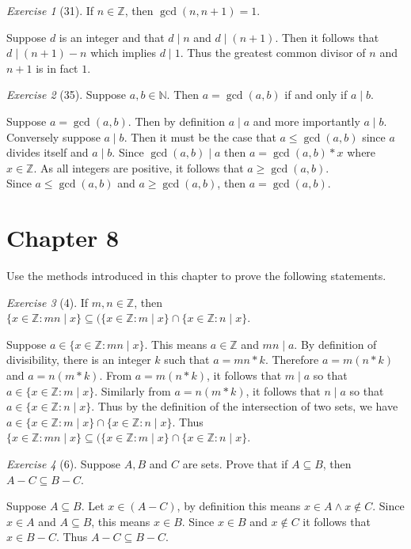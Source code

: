\documentclass[12pt]{amsart}
\makeatletter
\theoremstyle{remark}
\newtheorem*{exercise}{Exercise}%
\def\NN{\ensuremath{\mathbb N}}
\def\ZZ{\ensuremath{\mathbb Z}}
\renewenvironment{proof}[1][\proofname]{\par\doublespacing
  \pushQED{\qed}%
  \normalfont \topsep6\p@\@plus6\p@\relax
  \list{}{%
    \settowidth{\leftmargin}{\itshape\proofname:\hskip\labelsep}%
    \setlength{\labelwidth}{0pt}%
    \setlength{\itemindent}{-\leftmargin}%
  }%
  \item[\hskip\labelsep\itshape#1\@addpunct{:}]\ignorespaces
}{%
  \popQED\endlist\@endpefalse
  \singlespacing
}
\theoremstyle{mycomment}
\makeatother
\begin{document}
\begin{exercise}[31] If $n\in\ZZ$, then $\gcd(n,n+1)=1$.
\begin{proof}
Suppose $d$ is an integer and that $d \mid n$ and $d \mid (n+1)$. Then it follows that $d \mid (n+1) - n$ which implies $d \mid 1$. Thus the greatest common divisor of $n$ and $n+1$ is in fact $1$.
\end{proof}
\end{exercise}

\begin{exercise}[35] Suppose $a,b\in\NN$. Then $a=\gcd(a,b)$ if and only if $a\mid b$.
\begin{proof}
Suppose $a = \gcd(a,b)$. Then by definition $a \mid a$ and more importantly $a \mid b$. \\
Conversely suppose $ a \mid b$. Then it must be the case that $a \leq \gcd(a,b)$ since $a$ divides itself and $a \mid b$. Since $\gcd(a,b) \mid a$ then $a = \gcd(a,b) * x$ where $x \in \ZZ$. As all integers are positive, it follows that $a \geq \gcd(a,b)$. \\
Since $a \leq \gcd(a,b)$ and $a \geq \gcd(a,b)$, then $a = \gcd(a,b)$.
\end{proof}
\end{exercise}

\section*{Chapter 8}
Use the methods introduced in this chapter to prove the following statements.
\begin{exercise}[4] If $m,n\in\ZZ$, then $\{x\in \ZZ:mn\mid x\}\subseteq (\{x\in\ZZ:m\mid x\}\cap\{x\in\ZZ:n\mid x\}$.
\begin{proof}
Suppose $a \in \{x\in \ZZ:mn\mid x\}$. This means $a \in \ZZ$ and $mn \mid a$. By definition of divisibility, there is an integer $k$ such that $a = mn*k$. Therefore $a = m(n*k)$ and $a = n(m*k)$. From $a = m(n*k)$, it follows that $m \mid a$ so that $a \in \{x\in\ZZ:m\mid x\}$. Similarly from $a = n(m *k)$, it follows that $n \mid a$ so that $a \in \{x\in\ZZ:n\mid x \}$. Thus by the definition of the intersection of two sets, we have $a \in \{x\in\ZZ:m\mid x\}\cap\{x\in\ZZ:n\mid x\}$. Thus $\{x\in \ZZ:mn\mid x\}\subseteq (\{x\in\ZZ:m\mid x\}\cap\{x\in\ZZ:n\mid x\}$.
\end{proof}
\end{exercise}

\begin{exercise}[6] Suppose $A,B$ and $C$ are sets. Prove that if $A\subseteq B$, then $A-C\subseteq B-C$.
\begin{proof}
Suppose $A \subseteq B$. Let $x \in (A - C)$, by definition this means $x \in A \land x \notin C$. Since $x \in A$ and $A \subseteq B$, this means $x \in B$. Since $x \in B$ and $x \notin C$ it follows that $x \in B - C$. Thus $A - C \subseteq B - C$.
\end{proof}
\end{exercise}
\end{document}
